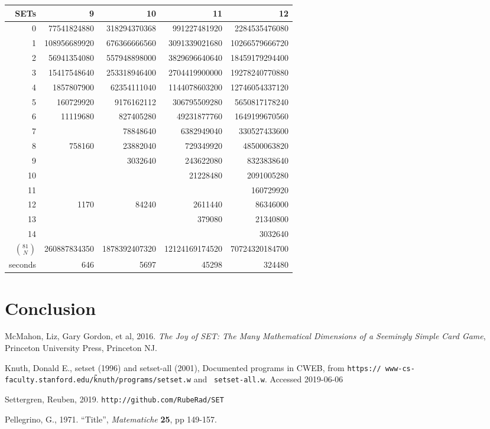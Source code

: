 \documentclass[10pt]{amsart}
\begin{document}
\begin{table}
  \begin{tabular}{r | r r r r }
    SETs & 9 & 10 & 11 & 12 \\
    \hline
0  & 77541824880 & 318294370368 & 991227481920 & 2284535476080 \\
1  & 108956689920 & 676366666560 & 3091339021680 & 10266579666720 \\
2  & 56941354080 & 557948898000 & 3829696640640 & 18459179294400 \\
3  & 15417548640 & 253318946400 & 2704419900000 & 19278240770880 \\
4  & 1857807900 & 62354111040 & 1144078603200 & 12746054337120 \\
5  & 160729920 & 9176162112 & 306795509280 & 5650817178240 \\
6  & 11119680 & 827405280 & 49231877760 & 1649199670560 \\
7  & & 78848640 & 6382949040 & 330527433600 \\
8  & 758160 & 23882040 & 729349920 & 48500063820 \\
9  &  & 3032640 & 243622080 & 8323838640 \\
10 &  &  & 21228480 & 2091005280 \\
11 &  &  & & 160729920 \\
12 & 1170 & 84240 & 2611440 & 86346000 \\
13 &  &  & 379080 & 21340800 \\
14 &  &  &  & 3032640 \\
\hline
$\binom{81}{N}$ & 260887834350 & 1878392407320 & 12124169174520 & 70724320184700 \\
\hline
seconds & 646 & 5697 & 45298 & 324480
  \end{tabular}
\end{table}

\section{Conclusion}


\begin{thebibliography}{9} %

 McMahon, Liz, Gary Gordon, et al, 2016. {\em The Joy of SET: The Many
  Mathematical Dimensions of a Seemingly Simple Card Game}, Princeton University Press, Princeton NJ.

Knuth, Donald E., {\sc setset} (1996) and {\sc setset-all}
  (2001), Documented programs in CWEB, from {\tt https://
      www-cs-faculty.stanford.edu/\~knuth/programs/setset.w} and {\tt
  setset-all.w}. Accessed 2019-06-06

Settergren, Reuben, 2019. {\tt http://github.com/RubeRad/SET}

Pellegrino, G., 1971. ``Title'', {\em Matematiche} {\bf 25}, pp
  149-157.

\end{thebibliography}
 
\end{document}
